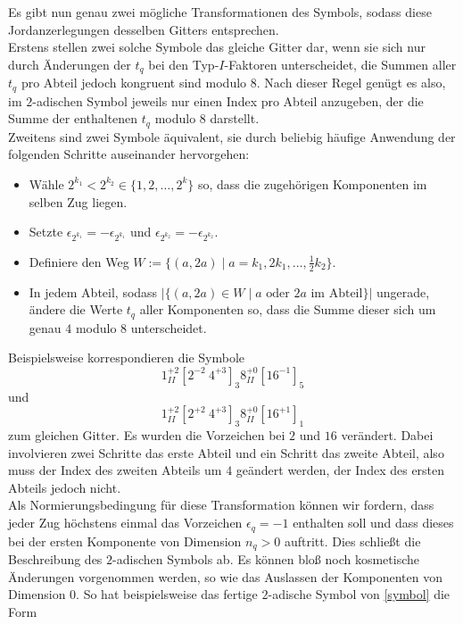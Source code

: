 \documentclass[12pt,a4paper,halfparskip,headsepline,bibtotocnumbered]{scrreprt}
\theoremstyle{nummermitklammern}
\theoremstyle{nonumberbreak}
\begin{document}
Es gibt nun genau zwei mögliche Transformationen des Symbols, sodass diese Jordanzerlegungen desselben Gitters entsprechen.\\
Erstens stellen zwei solche Symbole das gleiche Gitter dar, wenn sie sich nur durch Änderungen der $t_q$ bei den Typ-$I$-Faktoren unterscheidet, die Summen aller $t_q$ pro Abteil jedoch kongruent sind modulo $8$. Nach dieser Regel genügt es also, im $2$-adischen Symbol jeweils nur einen Index pro Abteil anzugeben, der die Summe der enthaltenen $t_q$ modulo $8$ darstellt.\\
Zweitens sind zwei Symbole äquivalent, sie durch beliebig häufige Anwendung der folgenden Schritte auseinander hervorgehen:
\begin{itemize}
	\item Wähle $2^{k_1} < 2^{k_2} \in \lbrace 1, 2, \dots, 2^k \rbrace$ so, dass die zugehörigen Komponenten im selben Zug liegen.
	\item Setzte $\epsilon_{2^{k_1}} = - \epsilon_{2^{k_1}}$ und $\epsilon_{2^{k_2}} = - \epsilon_{2^{k_2}}$.
	\item Definiere den Weg $W := \lbrace (a,2a) \mid a = k_1, 2 k_1, \dots, \frac{1}{2}k_2 \rbrace$.
	\item In jedem Abteil, sodass $\vert \lbrace (a, 2a) \in W \mid a \text{ oder } 2a \text{ im Abteil} \rbrace \vert$ ungerade, ändere die Werte $t_q$ aller Komponenten so, dass die Summe dieser sich um genau $4$ modulo $8$ unterscheidet.
\end{itemize}
Beispielsweise korrespondieren die Symbole
\begin{equation*}
	1_{II}^{+2} \left[ 2^{-2}\ 4^{+3} \right]_3 8_{II}^{+0} \left[ 16^{-1} \right]_5
\end{equation*}
und
\begin{equation*}
	1_{II}^{+2} \left[ 2^{+2}\ 4^{+3} \right]_3 8_{II}^{+0} \left[ 16^{+1} \right]_1
\end{equation*}
zum gleichen Gitter. Es wurden die Vorzeichen bei $2$ und $16$ verändert. Dabei involvieren zwei Schritte das erste Abteil und ein Schritt das zweite Abteil, also muss der Index des zweiten Abteils um $4$ geändert werden, der Index des ersten Abteils jedoch nicht.\\
Als Normierungsbedingung für diese Transformation können wir fordern, dass jeder Zug höchstens einmal das Vorzeichen $\epsilon_q = -1$ enthalten soll und dass dieses bei der ersten Komponente von Dimension $n_q > 0$ auftritt. Dies schließt die Beschreibung des $2$-adischen Symbols ab. Es können bloß noch kosmetische Änderungen vorgenommen werden, so wie das Auslassen der Komponenten von Dimension $0$. So hat beispielsweise das fertige $2$-adische Symbol von \eqref{symbol} die Form
\end{document}
